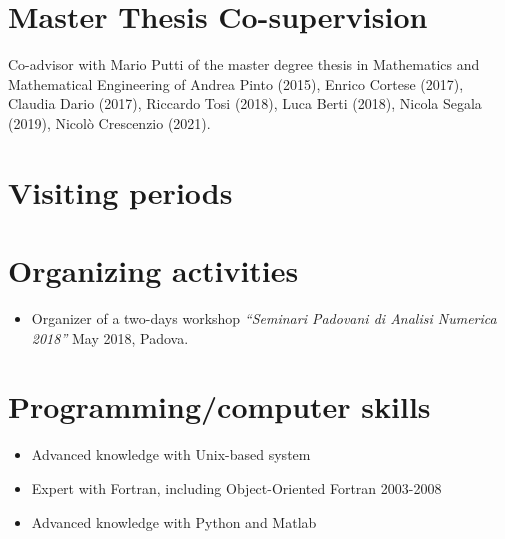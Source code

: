 \documentclass[11pt,a4paper,roman]{moderncv}
\begin{document}


\section{Master Thesis Co-supervision}
 Co-advisor with Mario Putti of the master degree thesis in
 Mathematics and Mathematical Engineering of Andrea Pinto
 (2015), Enrico Cortese (2017), Claudia Dario (2017),
 Riccardo Tosi (2018), Luca Berti (2018), Nicola Segala (2019), Nicol\`o Crescenzio (2021).

\section{Visiting periods}




  

\section{Organizing activities}
 \begin{itemize}
 \item Organizer of a two-days workshop
   \emph{``Seminari Padovani di Analisi Numerica 2018''} 
   May 2018, Padova.
 \end{itemize}


 \section{Programming/computer skills}
 \begin{itemize}
 \item Advanced knowledge with Unix-based system
 \item Expert with Fortran, including Object-Oriented Fortran 2003-2008
 \item Advanced knowledge with Python and Matlab
 \end{itemize}
\end{document}
